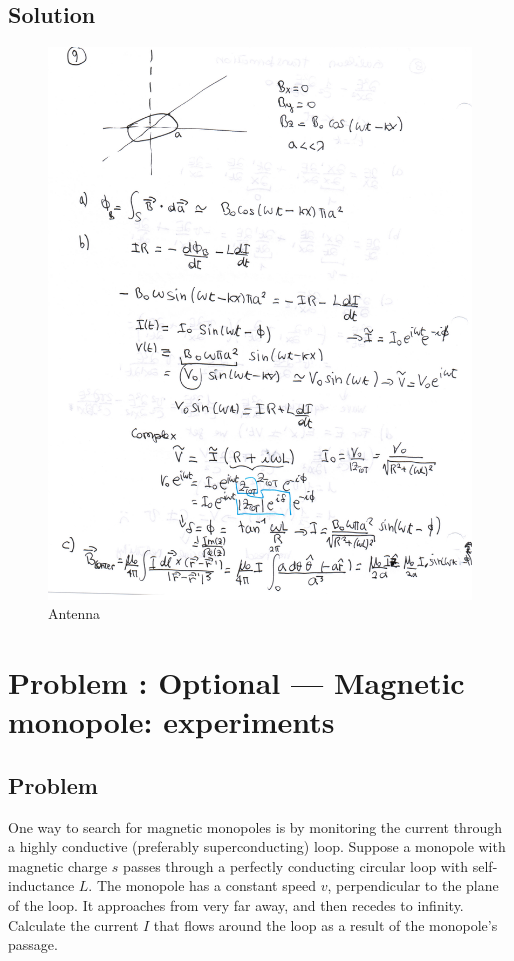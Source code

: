 \documentclass[solutions]{esg8022pset}
\begin{document}
\subsection{Solution}
 \begin{figure}[H]
    \centering
    \includegraphics[width = 15cm]{antenna_sol}
    \caption{Antenna}
\end{figure}
\section{Problem \thesection: Optional --- Magnetic monopole: experiments}
\subsection{Problem}
  One way to search for magnetic monopoles is by monitoring the current through a highly conductive (preferably superconducting) loop. Suppose a monopole with magnetic charge $s$ passes through a perfectly conducting circular loop with self-inductance $L$. The monopole has a constant speed $v$, perpendicular to the plane of the loop. It approaches from very far away, and then recedes to infinity. Calculate the current $I$ that flows around the loop as a result of the monopole's passage.
\end{document}
